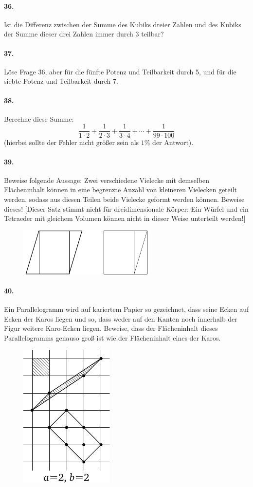 \documentclass[10pt,a5paper,twoside]{article}
\newenvironment{problem}[1]{\paragraph*{#1}}{}
\begin{document}
\begin{problem}{36.}
	Ist die Differenz zwischen der Summe des Kubiks dreier Zahlen und des Kubiks der Summe dieser drei Zahlen immer durch 3 teilbar? 
\end{problem}

\begin{problem}{37.}
	Löse Frage 36, aber für die fünfte Potenz und Teilbarkeit durch 5, und für die siebte Potenz und Teilbarkeit durch 7. 
\end{problem}

\begin{problem}{38.}
	Berechne diese Summe:
	\begin{equation*}
	\frac{1}{1\cdot 2} + \frac{1}{2\cdot 3} + \frac{1}{3\cdot 4} + \dotsb + \frac{1}{99\cdot 100}
	\end{equation*}
	(hierbei sollte der Fehler nicht größer sein als $1\%$ der Antwort).
\end{problem}

\begin{problem}{39.}
	Beweise folgende Aussage: Zwei verschiedene Vielecke mit demselben Flächeninhalt können in eine begrenzte Anzahl von kleineren Vielecken geteilt werden, sodass aus diesen Teilen beide Vielecke geformt werden können. Beweise dieses! [Dieser Satz stimmt nicht für dreidimensionale Körper: Ein Würfel und ein Tetraeder mit gleichem Volumen können nicht in dieser Weise unterteilt werden!]
	\begin{figure}[H]
	\centering
	\includegraphics{q39_horizontal}\\[6pt]
	\end{figure}
\end{problem}

\begin{problem}{40.}
	Ein Parallelogramm wird auf kariertem Papier so gezeichnet, dass seine Ecken auf Ecken der Karos liegen und so, dass weder auf den Kanten noch innerhalb der Figur weitere Karo-Ecken liegen. Beweise, dass der Flächeninhalt dieses Parallelogramms genauso groß ist wie der Flächeninhalt eines der Karos. 
	\begin{figure}[H]
	\centering
	\includegraphics{taskbook-24}
	\end{figure}
\end{problem}
\end{document}
